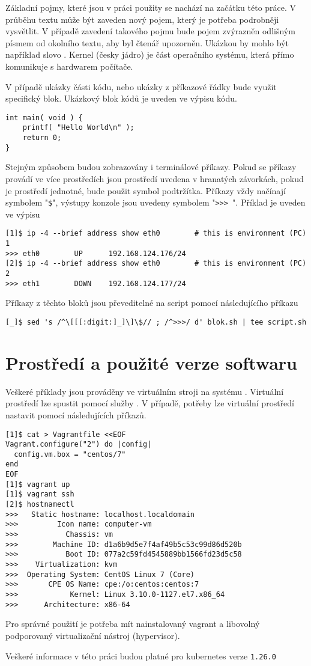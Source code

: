 Základní pojmy, které jsou v práci použity se nachází na začátku této práce. V průběhu textu může být zaveden nový pojem, který je potřeba podrobněji vysvětlit. V případě zavedení takového pojmu bude pojem zvýrazněn odlišným písmem od okolního textu, aby byl čtenář upozorněn. Ukázkou by mohlo být například slovo . Kernel (česky jádro) je část operačního systému, která přímo komunikuje s hardwarem počítače.  

V případě ukázky části kódu, nebo ukázky z příkazové řádky bude využit specifický blok. Ukázkový blok kódů je uveden ve výpisu kódu. 

\begin{verbatim}
int main( void ) {
    printf( "Hello World\n" );
    return 0;
}
\end{verbatim}


Stejným způsobem budou zobrazovány i terminálové příkazy. Pokud se příkazy provádí ve více prostředích jsou prostředí uvedena v hranatých závorkách, pokud je prostředí jednotné, bude použit symbol podtržítka. Příkazy vždy načínají symbolem "\verb|$|", výstupy konzole jsou uvedeny symbolem "\verb|>>> |". Příklad je uveden ve výpisu

\begin{verbatim}
[1]$ ip -4 --brief address show eth0        # this is environment (PC) 1
>>> eth0        UP      192.168.124.176/24
[2]$ ip -4 --brief address show eth0        # this is environment (PC) 2
>>> eth1        DOWN    192.168.124.177/24
\end{verbatim}


Příkazy z těchto bloků jsou převeditelné na script pomocí následujícího příkazu 
\begin{verbatim}
[_]$ sed 's /^\[[[:digit:]_]\]\$// ; /^>>>/ d' blok.sh | tee script.sh
\end{verbatim}

\section{Prostředí a použité verze softwaru}
Veškeré příklady jsou prováděny ve virtuálním stroji na systému . Virtuální prostředí lze spustit pomocí služby . V případě, potřeby lze virtuální prostředí nastavit pomocí následujících příkazů.
\begin{verbatim}
[1]$ cat > Vagrantfile <<EOF
Vagrant.configure("2") do |config|
  config.vm.box = "centos/7"
end
EOF
[1]$ vagrant up
[1]$ vagrant ssh
[2]$ hostnamectl
>>>   Static hostname: localhost.localdomain
>>>         Icon name: computer-vm
>>>           Chassis: vm
>>>        Machine ID: d1a6b9d5e7f4af49b5c53c99d86d520b
>>>           Boot ID: 077a2c59fd4545889bb1566fd23d5c58
>>>    Virtualization: kvm
>>>  Operating System: CentOS Linux 7 (Core)
>>>       CPE OS Name: cpe:/o:centos:centos:7
>>>            Kernel: Linux 3.10.0-1127.el7.x86_64
>>>      Architecture: x86-64
\end{verbatim}

Pro správné použití je potřeba mít nainstalovaný vagrant a libovolný podporovaný virtualizační nástroj (hypervisor).

Veškeré informace v této práci budou platné pro kubernetes verze \verb|1.26.0|